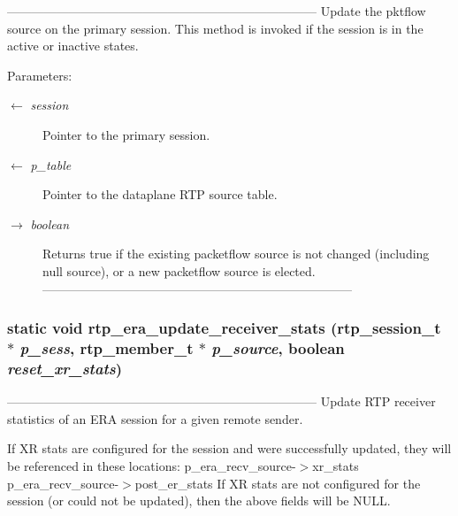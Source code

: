 --------------------------------------------------------------------------- Update the pktflow source on the primary session. This method is invoked if the session is in the active or inactive states.

\begin{Desc}
\item[Parameters:]
\begin{description}
\item[\mbox{$\leftarrow$} {\em session}]Pointer to the primary session. \item[\mbox{$\leftarrow$} {\em p\_\-table}]Pointer to the dataplane RTP source table. \item[\mbox{$\rightarrow$} {\em boolean}]Returns true if the existing packetflow source is not changed (including null source), or a new packetflow source is elected. --------------------------------------------------------------------------- \end{description}
\end{Desc}
\subsubsection{\setlength{\rightskip}{0pt plus 5cm}static void rtp\_\-era\_\-update\_\-receiver\_\-stats (rtp\_\-session\_\-t $\ast$ {\em p\_\-sess}, rtp\_\-member\_\-t $\ast$ {\em p\_\-source}, boolean {\em reset\_\-xr\_\-stats})\hspace{0.3cm}{\tt  [static]}}\label{rtp__era__recv_8c_df4735a056f75e47a29cf4fc2baa7897}


--------------------------------------------------------------------------- Update RTP receiver statistics of an ERA session for a given remote sender.

If XR stats are configured for the session and were successfully updated, they will be referenced in these locations: p\_\-era\_\-recv\_\-source-$>$xr\_\-stats p\_\-era\_\-recv\_\-source-$>$post\_\-er\_\-stats If XR stats are not configured for the session (or could not be updated), then the above fields will be NULL.

